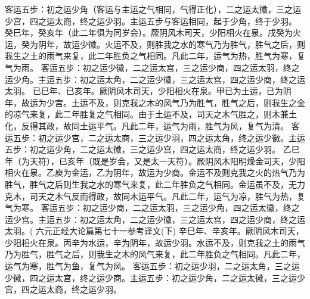 \documentclass[a4paper,12pt,UTF8,twoside]{ctexbook}
\begin{document}
客运五步：初之运少角（客运与主运之气相同，气得正化），二之运太徽，三之运少宫，四之运太商，终之运少羽。主运五步与客运相同，起于少角，终于少羽。
癸巳年，癸亥年（此二年俱为同岁会）。厥阴风木司天，少阳相火在泉。戌癸为火运，癸为阴年，故运少徽。火运不及，则胜我之水的寒气乃为胜气，胜气之后，则我生之土的雨气来复，此二年胜负之气相同。凡此二年，运气为热，胜气为寒，复气为雨。
客运五步：初之运少徽，二之运太宫，三之运少商，四之运太羽，终之运少角。主运五步：初之运太角，二之运少徽，三之运太宫，四之运少商，终之运太羽。
已巳年、已亥年。厥阴风木司天，少阳相火在泉。甲已为土运，已为阴年，故运为少宫。土运不及，则克我之木的风气乃为胜气，胜气之后，则我生之金的凉气来复，此二年胜复之气相同。由于土运不及，司天之木气胜之，则木兼土化，反得其政，故同土运平气。凡此二年，运气为雨，胜气为风，复气为清。
客运五步：初之运少宫，二之运太商，三之运少羽，四之运太角，终之运少徽。主运五步：初之运少角，二之运太徽，三之运少宫，四之运太商，终之运少羽。
乙巳年（为天符），已亥年（既是岁会，又是太一天符）。厥阴风木阳明燥金司天，少阳相火在泉。乙庾为金运，乙为阴年，故运为少商。金运不及则克我之火的热气乃为胜气，胜气之后则生我之水的寒气来复，此二年胜负之气相同。金运虽不及，无力克木，司天之木气反而得政，故同木运平气。凡此二年，运气为凉，胜气为热，复气为寒。
客运五步：初之运少商，二之运太羽，三之运少角，四之运太徽，终之运少宫。主运五步：初之运太角，二之运少徽，三之运太宫，四之运少商，终之运太羽。(
六元正经大论篇第七十一参考译文(下)
辛巳年、辛亥年。厥阴风木司天，少阳相火在泉。丙辛为水运，辛为阴年，故运少羽。水运不及，则克我之土的雨气乃为胜气，胜气之后，则我生之木的风气来复，此二年胜负之气相同。凡此二年，运气为寒，胜气为鱼，复气为风。
客运五步：初之运少羽，二之运太角，三之运少徽，四之运太宫，终之运少商。主运五步：初之运少角，二之运太徽，三之运少宫，四之运太商，终之运少羽。
\end{document}
